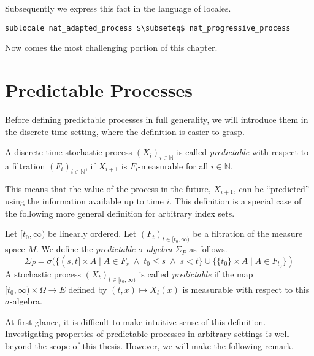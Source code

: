 Subsequently we express this fact in the language of locales.

\begin{isalemma}
{\small
\begin{lstlisting}[style=isabelle]
sublocale nat_adapted_process $\subseteq$ nat_progressive_process
\end{lstlisting}
}
\end{isalemma}

Now comes the most challenging portion of this chapter.

\section{Predictable Processes}

Before defining predictable processes in full generality, we will introduce them in the discrete-time setting, where the definition is easier to grasp.

\begin{definition}
	A discrete-time stochastic process $(X_i)_{i\in\mathbb{N}}$ is called \textit{predictable} with respect to a filtration $(F_i)_{i\in\mathbb{N}}$, if $X_{i + 1}$ is $F_i$-measurable for all $i \in \mathbb{N}$.
\end{definition}

This means that the value of the process in the future, $X_{i+1}$, can be ``predicted'' using the information available up to time $i$. This definition is a special case of the following more general definition for arbitrary index sets.

\begin{definition}
	Let $[t_0, \infty)$ be linearly ordered.  Let $(F_t)_{t\in[t_0, \infty)}$ be a filtration of the measure space $M$. We define the \textit{predictable $\sigma$-algebra} $\Sigma_P$ as follows.
	\[
		\Sigma_P = \sigma(\{(s,t] \times A \;\vert\; A \in F_s \;\wedge\; t_0 \le s \;\wedge\; s < t \} \cup \{\{t_0\} \times A \;\vert\; A \in F_{t_0}\})
	\]
	A stochastic process $(X_t)_{t\in[t_0, \infty)}$ is called \textit{predictable} if the map $[t_0, \infty) \times \Omega \rightarrow E$ defined by $(t,x) \mapsto X_t(x)$ is measurable with respect to this $\sigma$-algebra.
\end{definition}

At first glance, it is difficult to make intuitive sense of this definition. Investigating properties of predictable processes in arbitrary settings is well beyond the scope of this thesis. However, we will make the following remark.

